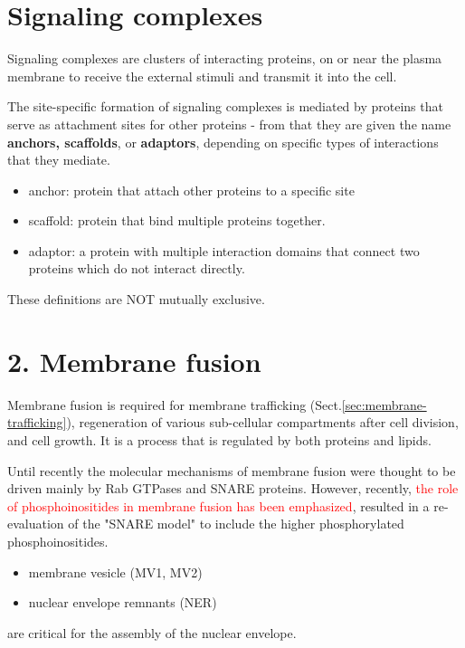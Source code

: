 
\section{Signaling complexes}
\label{sec:signaling-complexes}

Signaling complexes are clusters of interacting proteins, on or near
the plasma membrane to receive the external stimuli and transmit it
into the cell. 

The site-specific formation of signaling complexes is mediated by
proteins that serve as attachment sites for other proteins - from that
they are given the name {\bf anchors, scaffolds}, or {\bf adaptors},
depending on specific types of interactions that they mediate. 
\begin{itemize}
\item anchor: protein that attach other proteins to a specific site
\item scaffold: protein that bind multiple proteins together. 
\item adaptor: a protein with multiple interaction domains that
  connect two proteins which do not interact directly. 
\end{itemize}
These definitions are NOT mutually exclusive. 

\section{2. Membrane fusion}
\label{sec:SNARE-protein-in-membrane-formation}
\label{sec:Rab-GTPase-in-membrane-formation}

Membrane fusion is required for membrane trafficking
(Sect.\ref{sec:membrane-trafficking}), regeneration of various sub-cellular
compartments after cell division, and cell growth. It is a process that is
regulated by both proteins and lipids.

Until recently the molecular mechanisms of membrane fusion were thought to be
driven mainly by Rab GTPases and SNARE proteins.
However, recently, \textcolor{red}{the role of phosphoinositides in membrane
fusion has been emphasized}, resulted in a re-evaluation of the "SNARE model" to
include the higher phosphorylated phosphoinositides. \citep{zhendre2011}

\begin{itemize}
  \item membrane vesicle (MV1, MV2) 
  \item nuclear envelope remnants (NER) 
\end{itemize}
are critical for the assembly of the nuclear envelope.

